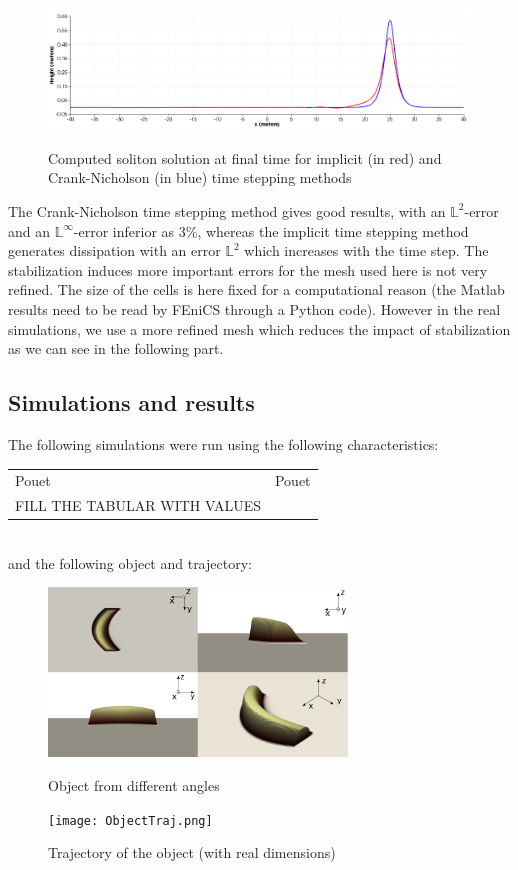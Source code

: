 \documentclass[11pt,a4paper]{article}
\begin{document}
	\begin{figure}[!h]
		\centering
		\includegraphics[height=4cm]{SolitonSolution.png}
		\caption{Computed soliton solution at final time for implicit (in red) and Crank-Nicholson (in blue) time stepping methods}
	\end{figure}
	
	The Crank-Nicholson time stepping method gives good results, with an $\mathbb{L}^2$-error and an $\mathbb{L}^{\infty}$-error inferior as $3\%$, whereas the implicit time stepping method generates dissipation with an error $\mathbb{L}^2$ which increases with the time step. The stabilization induces more important errors for the mesh used here is not very refined. The size of the cells is here fixed for a computational reason (the Matlab results need to be read by FEniCS through a Python code). However in the real simulations, we use a more refined mesh which reduces the impact of stabilization as we can see in the following part. 
				
\subsection{Simulations and results}
	The following simulations were run using the following characteristics: \\
	\begin{tabular}{|l|r|}
		Pouet & Pouet	\\
		FILL THE TABULAR WITH VALUES &
	\end{tabular}\\
	and the following object and trajectory:
	\begin{figure}[!h]
		\begin{minipage}[t]{0.5\linewidth}
			\centering
			\includegraphics[height=4.5cm]{ObjectUsedModified.png}
			\caption{Object from different angles}
		\end{minipage}
		\hspace{10pt}
		\begin{minipage}[t]{0.5\linewidth}
			\centering
			\texttt{[image: ObjectTraj.png]}
			\caption{Trajectory of the object (with real dimensions)}
		\end{minipage}
	\end{figure}
	
\end{document}
